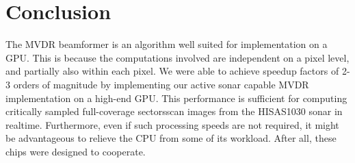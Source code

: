 \documentclass[12pt,journal,captionsoff,onecolumn]{IEEEtran}
\newcommand\1{\vec 1}
\begin{document}
% 
% 
% 


\section{Conclusion}

The \gls{MVDR} beamformer is an algorithm well suited for implementation on a \gls{GPU}. This is because the computations involved are independent on a pixel level, and partially also within each pixel. We were able to achieve speedup factors of 2-3 orders of magnitude by implementing our active sonar capable \gls{MVDR} implementation on a high-end \gls{GPU}. This performance is sufficient for computing critically sampled full-coverage sectorsscan images from the HISAS1030 sonar in realtime. Furthermore, even if such processing speeds are not required, it might be advantageous to relieve the \gls{CPU} from some of its workload. After all, these chips were designed to cooperate.





\end{document}
